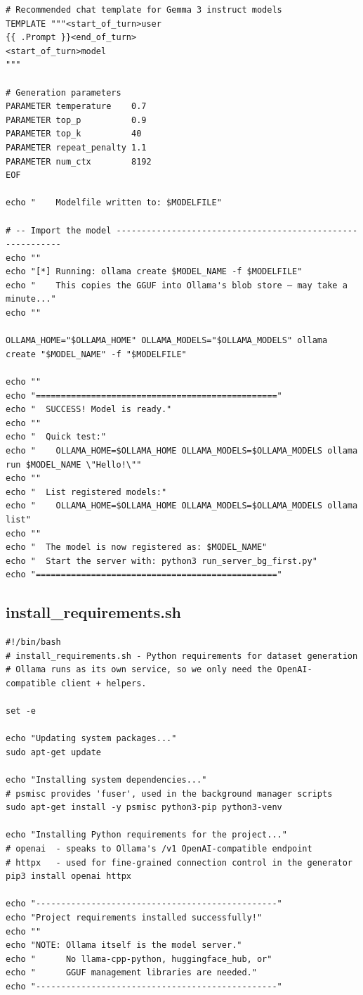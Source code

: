 \documentclass[11pt]{article}
\begin{document}
\begin{lstlisting}[style=bashstyle, caption={setup\_ollama\_model.sh}]
# Recommended chat template for Gemma 3 instruct models
TEMPLATE """<start_of_turn>user
{{ .Prompt }}<end_of_turn>
<start_of_turn>model
"""

# Generation parameters
PARAMETER temperature    0.7
PARAMETER top_p          0.9
PARAMETER top_k          40
PARAMETER repeat_penalty 1.1
PARAMETER num_ctx        8192
EOF

echo "    Modelfile written to: $MODELFILE"

# -- Import the model -----------------------------------------------------------
echo ""
echo "[*] Running: ollama create $MODEL_NAME -f $MODELFILE"
echo "    This copies the GGUF into Ollama's blob store — may take a minute..."
echo ""

OLLAMA_HOME="$OLLAMA_HOME" OLLAMA_MODELS="$OLLAMA_MODELS" ollama create "$MODEL_NAME" -f "$MODELFILE"

echo ""
echo "================================================"
echo "  SUCCESS! Model is ready."
echo ""
echo "  Quick test:"
echo "    OLLAMA_HOME=$OLLAMA_HOME OLLAMA_MODELS=$OLLAMA_MODELS ollama run $MODEL_NAME \"Hello!\""
echo ""
echo "  List registered models:"
echo "    OLLAMA_HOME=$OLLAMA_HOME OLLAMA_MODELS=$OLLAMA_MODELS ollama list"
echo ""
echo "  The model is now registered as: $MODEL_NAME"
echo "  Start the server with: python3 run_server_bg_first.py"
echo "================================================"
\end{lstlisting}

\newpage
\subsection{install\_requirements.sh}
\begin{lstlisting}[style=bashstyle, caption={install\_requirements.sh}]
#!/bin/bash
# install_requirements.sh - Python requirements for dataset generation
# Ollama runs as its own service, so we only need the OpenAI-compatible client + helpers.

set -e

echo "Updating system packages..."
sudo apt-get update

echo "Installing system dependencies..."
# psmisc provides 'fuser', used in the background manager scripts
sudo apt-get install -y psmisc python3-pip python3-venv

echo "Installing Python requirements for the project..."
# openai  - speaks to Ollama's /v1 OpenAI-compatible endpoint
# httpx   - used for fine-grained connection control in the generator
pip3 install openai httpx

echo "------------------------------------------------"
echo "Project requirements installed successfully!"
echo ""
echo "NOTE: Ollama itself is the model server."
echo "      No llama-cpp-python, huggingface_hub, or"
echo "      GGUF management libraries are needed."
echo "------------------------------------------------"
\end{lstlisting}
\end{document}
